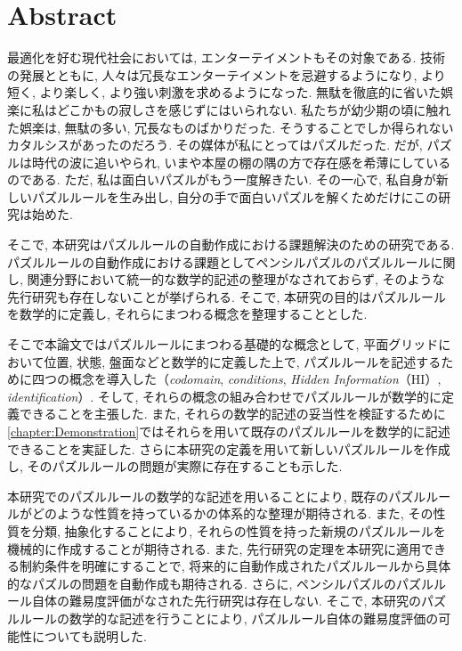 \chapter*{{\rm \bf Abstract}}\label{chapter:Abstract}
最適化を好む現代社会においては, エンターテイメントもその対象である. 技術の発展とともに, 人々は冗長なエンターテイメントを忌避するようになり, より短く, より楽しく, より強い刺激を求めるようになった. 無駄を徹底的に省いた娯楽に私はどこかもの寂しさを感じずにはいられない. 私たちが幼少期の頃に触れた娯楽は, 無駄の多い, 冗長なものばかりだった. そうすることでしか得られないカタルシスがあったのだろう. その媒体が私にとってはパズルだった. だが, パズルは時代の波に追いやられ, いまや本屋の棚の隅の方で存在感を希薄にしているのである. ただ, 私は面白いパズルがもう一度解きたい. その一心で, 私自身が新しいパズルルールを生み出し, 自分の手で面白いパズルを解くためだけにこの研究は始めた.


そこで, 本研究はパズルルールの自動作成における課題解決のための研究である. パズルルールの自動作成における課題としてペンシルパズルのパズルルールに関し, 関連分野において統一的な数学的記述の整理がなされておらず, そのような先行研究も存在しないことが挙げられる. そこで, 本研究の目的はパズルルールを数学的に定義し, それらにまつわる概念を整理することとした.

そこで本論文ではパズルルールにまつわる基礎的な概念として, 平面グリッドにおいて位置, 状態, 盤面などと数学的に定義した上で, パズルルールを記述するために四つの概念を導入した（\textit{codomain}, \textit{conditions}, \textit{Hidden Information}（HI）, \textit{identification}）. そして, それらの概念の組み合わせでパズルルールが数学的に定義できることを主張した. また, それらの数学的記述の妥当性を検証するために\cref{chapter:Demonstration}ではそれらを用いて既存のパズルルールを数学的に記述できることを実証した. さらに本研究の定義を用いて新しいパズルルールを作成し, そのパズルルールの問題が実際に存在することも示した.

本研究でのパズルルールの数学的な記述を用いることにより, 既存のパズルルールがどのような性質を持っているかの体系的な整理が期待される. また, その性質を分類, 抽象化することにより, それらの性質を持った新規のパズルルールを機械的に作成することが期待される. また, 先行研究の定理を本研究に適用できる制約条件を明確にすることで, 将来的に自動作成されたパズルルールから具体的なパズルの問題を自動作成も期待される. さらに, ペンシルパズルのパズルルール自体の難易度評価がなされた先行研究は存在しない. そこで, 本研究のパズルルールの数学的な記述を行うことにより, パズルルール自体の難易度評価の可能性についても説明した.